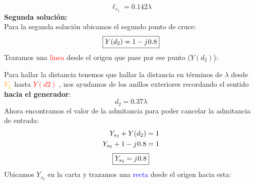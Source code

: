 \documentclass[
	12pt, %
	fleqn, %
	a4paper, %
	oneside, %
]{LegrandOrangeBook}
\begin{document}
\begin{example}
\begin{equation*}
\boxed{\ell_{s_1}=0.142\lambda}
\end{equation*}
\textbf{Segunda solución:}\\
Para la segunda solución ubicamos el segundo punto de cruce:
\begin{equation*}
\boxed{Y(d_2)=1-{j\mkern1mu} 0.8}
\end{equation*}
Trazamos una \textcolor{red}{linea} desde el origen que pase por ese punto ($Y(d_2)$):
\begin{center}
\end{center}
Para hallar la distancia tenemos que hallar la distancia en términos de $\lambda$ desde \textcolor{orange}{$Y_L$} hasta \textcolor{red}{$Y(d2)$} , nos ayudamos de los anillos exteriores recordando el sentido \textbf{hacia el generador}:
\begin{equation*}
\boxed{d_2=0.37\lambda}
\end{equation*}
Ahora encontramos el valor de la admitancia para poder cancelar la admitancia de entrada:
\begin{align*}
Y_{s_2}+Y(d_2)&=1\\
Y_{s_2}+1-{j\mkern1mu} 0.8&=1
\end{align*}
\begin{equation*}
\boxed{Y_{s_2}={j\mkern1mu} 0.8}
\end{equation*}
Ubicamos $Y_{s_2}$ en la carta y trazamos una \textcolor{blue}{recta} desde el origen hacia esta:
\begin{center}
\end{center}
\end{example}
\end{document}
